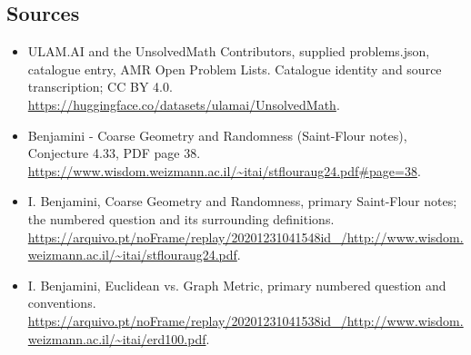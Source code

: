 \documentclass[11pt,a4paper]{article}
\begin{document}
\subsection{Sources}
\begin{itemize}
\item[S1] ULAM.AI and the UnsolvedMath Contributors, supplied problems.json, catalogue entry, AMR Open Problem Lists. Catalogue identity and source transcription; CC BY 4.0.
\url{https://huggingface.co/datasets/ulamai/UnsolvedMath}.
\item[S2] Benjamini - Coarse Geometry and Randomness (Saint-Flour notes), Conjecture 4.33, PDF page 38. 
\url{https://www.wisdom.weizmann.ac.il/~itai/stflouraug24.pdf#page=38}.
\item[S3] I. Benjamini, Coarse Geometry and Randomness, primary Saint-Flour notes; the numbered question and its surrounding definitions.
\url{https://arquivo.pt/noFrame/replay/20201231041548id_/http://www.wisdom.weizmann.ac.il/~itai/stflouraug24.pdf}.
\item[S4] I. Benjamini, Euclidean vs. Graph Metric, primary numbered question and conventions.
\url{https://arquivo.pt/noFrame/replay/20201231041538id_/http://www.wisdom.weizmann.ac.il/~itai/erd100.pdf}.
\end{itemize}
\end{document}

